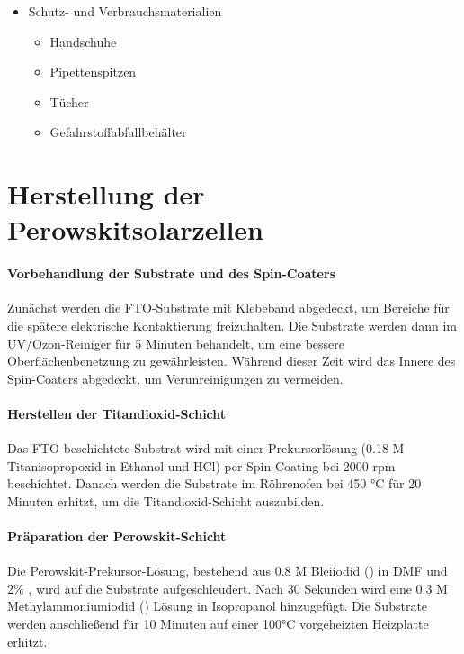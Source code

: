 \documentclass[12pt,a4paper,ngerman]{report}
\begin{document}
{\begin{itemize}[itemsep=0pt, parsep=0pt]
\begin{itemize}[itemsep=0pt, parsep=0pt]
				\item Maske zur Flächenabdeckung
				\item Klammern zur Befestigung der Rückelektrode
				\item optische Filter (für Messungen bei verschiedenen Lichtintensitäten)
			\end{itemize}
			\item Schutz- und Verbrauchsmaterialien
			\begin{itemize}[itemsep=0pt, parsep=0pt]
				\item Handschuhe
				\item Pipettenspitzen
				\item Tücher
				\item Gefahrstoffabfallbehälter
			\end{itemize}
		\end{itemize} }

	\section[Durchführung]{Herstellung der Perowskitsolarzellen}
	\paragraph{Vorbehandlung der Substrate und des Spin-Coaters}
		Zunächst werden die FTO-Substrate mit Klebeband abgedeckt, um Bereiche für die spätere elektrische Kontaktierung freizuhalten. Die Substrate werden dann im UV/Ozon-Reiniger für 5 Minuten behandelt, um eine bessere Oberflächenbenetzung zu gewährleisten. Während dieser Zeit wird das Innere des Spin-Coaters abgedeckt, um Verunreinigungen zu vermeiden.
	
	\paragraph{Herstellen der Titandioxid-Schicht}	
		Das FTO-beschichtete Substrat wird mit einer Prekursorlösung (0.18 M Titanisopropoxid in Ethanol und HCl) per Spin-Coating bei 2000 rpm beschichtet. Danach werden die Substrate im Röhrenofen bei 450 °C für 20 Minuten erhitzt, um die Titandioxid-Schicht auszubilden.
	
		\paragraph{Präparation der Perowskit-Schicht}
			Die Perowskit-Prekursor-Lösung, bestehend aus 0.8 M Bleiiodid () in DMF und 2\% , wird auf die Substrate aufgeschleudert. Nach 30 Sekunden wird eine 0.3 M Methylammoniumiodid () Lösung in Isopropanol hinzugefügt. Die Substrate werden anschließend für 10 Minuten auf einer 100°C vorgeheizten Heizplatte erhitzt.
	
\end{document}
